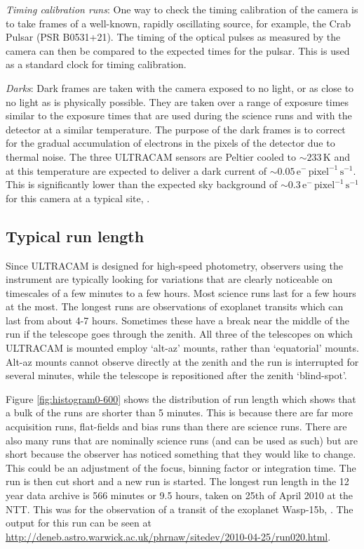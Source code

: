 \emph{Timing calibration runs}: One way to check the timing calibration of the camera is to take frames of a well-known, rapidly oscillating source, for example, the Crab Pulsar (PSR B0531+21). The timing of the optical pulses as measured by the camera can then be compared to the expected times for the pulsar. This is used as a standard clock for timing calibration.

\emph{Darks}: Dark frames are taken with the camera exposed to no light, or as close to no light as is physically possible. They are taken over a range of exposure times similar to the exposure times that are used during the science runs and with the detector at a similar temperature. The purpose of the dark frames is to correct for the gradual accumulation of electrons in the pixels of the detector due to thermal noise. The three ULTRACAM sensors are Peltier cooled to $\sim 233\,\mbox{K}$ and at this temperature are expected to deliver a dark current of $\sim0.05\,\mbox{e}^{-}\,\mbox{pixel}^{-1}\,\mbox{s}^{-1}$. This is significantly lower than the expected sky background of $\sim0.3\,\mbox{e}^{-}\,\mbox{pixel}^{-1}\,\mbox{s}^{-1}$ for this camera at a typical site, \citep{dhillon07}. 

\subsection{Typical run length}
Since ULTRACAM is designed for high-speed photometry, observers using the instrument are typically looking for variations that are clearly noticeable on timescales of a few minutes to a few hours. Most science runs last for a few hours at the most. The longest runs are observations of exoplanet transits which can last from about 4-7 hours. Sometimes these have a break near the middle of the run if the telescope goes through the zenith. All three of the telescopes on which ULTRACAM is mounted employ `alt-az' mounts, rather than `equatorial' mounts. Alt-az mounts cannot observe directly at the zenith and the run is interrupted for several minutes, while the telescope is repositioned after the zenith `blind-spot'.

Figure \ref{fig:histogram0-600} shows the distribution of run length which shows that a bulk of the runs are shorter than 5 minutes. This is because there are far more acquisition runs, flat-fields and bias runs than there are science runs. There are also many runs that are nominally science runs (and can be used as such) but are short because the observer has noticed something that they would like to change. This could be an adjustment of the focus, binning factor or integration time. The run is then cut short and a new run is started. The longest run length in the 12 year data archive is 566 minutes or 9.5 hours, taken on 25th of April 2010 at the NTT. This was for the observation of a transit of the exoplanet Wasp-15b, \citep{Wasp15b}. The output for this run can be seen at \url{http://deneb.astro.warwick.ac.uk/phrnaw/sitedev/2010-04-25/run020.html}. 

